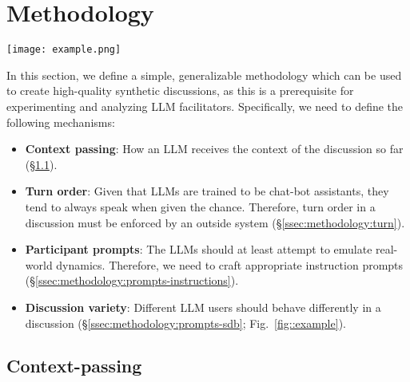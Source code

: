 %

\section{Methodology}
\label{sec:methodology}

 \begin{figure*}[t]
	\centering
	\texttt{[image: example.png]}
	\caption{Excerpt from a synthetic discussion. The \ac{LLM} participants use their \ac{SDB} prompts to insert personal stories and justify their perspectives in the discussion. Comments are clipped due to length. @CynicalInvestor88 is also a part of the discussion; not a hallucination.}
	\label{fig::example}
\end{figure*}

In this section, we define a simple, generalizable methodology which can be used to create high-quality synthetic discussions, as this is a prerequisite for experimenting and analyzing \ac{LLM} facilitators. Specifically, we need to define the following mechanisms:

\begin{itemize}[nosep, noitemsep]
	\item \textbf{Context passing}: How an \ac{LLM} receives the context of the discussion so far (\S\ref{ssec:methodology:context}).  
	
	\item \textbf{Turn order}: Given that \acp{LLM} are trained to be chat-bot assistants, they tend to always speak when given the chance. Therefore, turn order in a discussion must be enforced by an outside system (\S\ref{ssec:methodology:turn}).
	
	\item \textbf{Participant prompts}: The \acp{LLM} should at least attempt to emulate real-world dynamics. Therefore, we need to craft appropriate instruction prompts (\S\ref{ssec:methodology:prompts-instructions}).
	
	\item \textbf{Discussion variety}: Different \ac{LLM} users should behave differently in a discussion (\S\ref{ssec:methodology:prompts-sdb}; Fig.~\ref{fig::example}).
\end{itemize}

\subsection{Context-passing}
\label{ssec:methodology:context}

